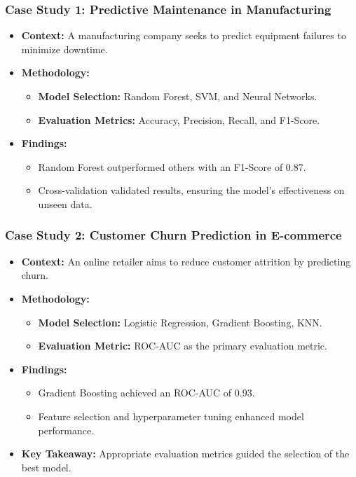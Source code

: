 \documentclass{beamer}
\begin{document}
\begin{frame}[fragile]
    \frametitle{Case Study 1: Predictive Maintenance in Manufacturing}
    \begin{itemize}
        \item \textbf{Context:} A manufacturing company seeks to predict equipment failures to minimize downtime.
        
        \item \textbf{Methodology:}
            \begin{itemize}
                \item \textbf{Model Selection:} Random Forest, SVM, and Neural Networks.
                \item \textbf{Evaluation Metrics:} Accuracy, Precision, Recall, and F1-Score.
            \end{itemize}
        
        \item \textbf{Findings:}
            \begin{itemize}
                \item Random Forest outperformed others with an F1-Score of 0.87.
                \item Cross-validation validated results, ensuring the model's effectiveness on unseen data.
            \end{itemize}
    \end{itemize}
\end{frame}

\begin{frame}[fragile]
    \frametitle{Case Study 2: Customer Churn Prediction in E-commerce}
    \begin{itemize}
        \item \textbf{Context:} An online retailer aims to reduce customer attrition by predicting churn.
        
        \item \textbf{Methodology:}
            \begin{itemize}
                \item \textbf{Model Selection:} Logistic Regression, Gradient Boosting, KNN.
                \item \textbf{Evaluation Metric:} ROC-AUC as the primary evaluation metric.
            \end{itemize}
        
        \item \textbf{Findings:}
            \begin{itemize}
                \item Gradient Boosting achieved an ROC-AUC of 0.93.
                \item Feature selection and hyperparameter tuning enhanced model performance.
            \end{itemize}
        
        \item \textbf{Key Takeaway:} Appropriate evaluation metrics guided the selection of the best model.
    \end{itemize}
\end{frame}
\end{document}
